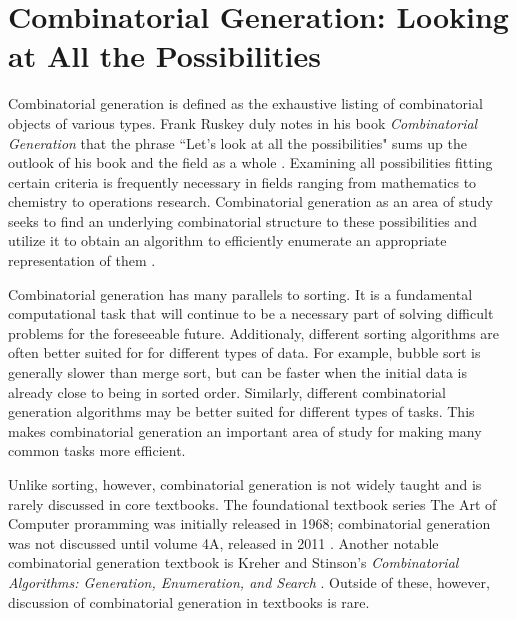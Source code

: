 
\section{Combinatorial Generation: Looking at All the Possibilities}

Combinatorial generation is defined as the exhaustive listing of combinatorial objects of various types.  Frank Ruskey duly notes in his book \emph{Combinatorial Generation} that the phrase ``Let's look at all the possibilities" sums up the outlook of his book and the field as a whole \cite{ruskey2003combinatorial}. Examining all possibilities fitting certain criteria is frequently necessary in fields ranging from mathematics to chemistry to operations research. Combinatorial generation as an area of study seeks to find an underlying combinatorial structure to these possibilities and utilize it to obtain an algorithm to efficiently enumerate an appropriate representation of them \cite{ruskey2003combinatorial}. 

Combinatorial generation has many parallels to sorting.  It is a fundamental computational task that will continue to be a necessary part of solving difficult problems for the foreseeable future.  Additionaly, different sorting algorithms are often better suited for for different types of data.  For example, bubble sort is generally slower than merge sort, but can be faster when the initial data is already close to being in sorted order. Similarly, different combinatorial generation algorithms may be better suited for different types of tasks.  This makes combinatorial generation an important area of study for making many common tasks more efficient.  

Unlike sorting, however, combinatorial generation is not widely taught and is rarely discussed in core textbooks. The foundational textbook series The Art of Computer proramming was initially released in 1968; combinatorial generation was not discussed until volume 4A, released in 2011 \cite{knuth2015art}.  Another notable combinatorial generation textbook is  Kreher and Stinson's \emph{Combinatorial Algorithms: Generation, Enumeration, and Search} \cite{kreher2020combinatorial}. Outside of these, however, discussion of combinatorial generation in textbooks is rare.

